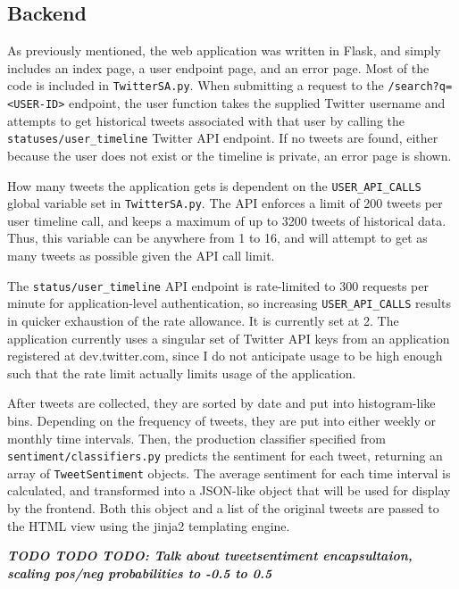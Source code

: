 \documentclass[letter,12pt]{article}
\begin{document}
\subsection{Backend}

As previously mentioned, the web application was written in
Flask, and simply includes an index page, a user endpoint page, and an error
page. Most of the code is included in \texttt{TwitterSA.py}. When submitting a
request to the \texttt{/search?q=<USER-ID>} endpoint, the user function takes
the supplied Twitter username and attempts to get historical tweets associated
with that user by calling the \texttt{statuses/user\_timeline} Twitter API
endpoint. If no tweets are found, either because the user does not exist or the
timeline is private, an error page is shown.

How many tweets the application gets is dependent on the
\texttt{USER\_API\_CALLS} global variable set in \texttt{TwitterSA.py}. The API
enforces a limit of 200 tweets per user timeline call, and keeps a maximum
of up to 3200 tweets of historical data. Thus, this variable can be anywhere
from 1 to 16, and will attempt to get as many tweets as possible given the API
call limit.

The \texttt{status/user\_timeline} API endpoint is rate-limited to 300 requests
per minute for application-level authentication, so increasing
\texttt{USER\_API\_CALLS} results in quicker exhaustion of the rate allowance.
It is currently set at 2. The application currently uses a singular set of
Twitter API keys from an application registered at dev.twitter.com, since I do
not anticipate usage to be high enough such that the rate limit actually limits
usage of the application.

After tweets are collected, they are sorted by date and put into histogram-like
bins. Depending on the frequency of tweets, they are put into either weekly or
monthly time intervals. Then, the production classifier specified from
\texttt{sentiment/classifiers.py} predicts the sentiment for each tweet,
returning an array of \texttt{TweetSentiment} objects. The average sentiment
for each time interval is calculated, and transformed into a JSON-like object
that will be used for display by the frontend. Both this object and a list of
the original tweets are passed to the HTML view using the jinja2 templating
engine.

\textbf{\emph{TODO TODO TODO: Talk about tweetsentiment encapsultaion, scaling pos/neg
probabilities to -0.5 to 0.5}}
\end{document}
